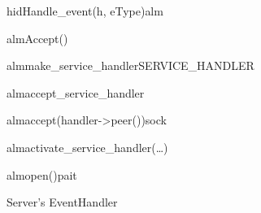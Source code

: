 \documentclass[Main]{subfiles}
\begin{document}
\begin{figure}[htbp]
\begin {sequencediagram}


	\begin{messcall}{hid}{Handle\_event(h, eType)}{alm}

		\begin{callself}{alm}{Accept()}{}
			\begin{callself}{alm}{make\_service\_handler}{SERVICE\_HANDLER}
			\end{callself}

			\begin{callself}{alm}{accept\_service\_handler}{}
				\begin{call}{alm}{accept(handler->peer())}{sock}{}
				\end{call}
			\end{callself}

			\begin{callself}{alm}{activate\_service\_handler(\dots)}{}
				\begin{call}{alm}{open()}{pait}{}
				\end{call}
			\end{callself}
		\end{callself}







	\end{messcall}

\end{sequencediagram}

\caption{Server's EventHandler}
\label{fig:SererEventHandler}
\end{figure}
\end{document}
